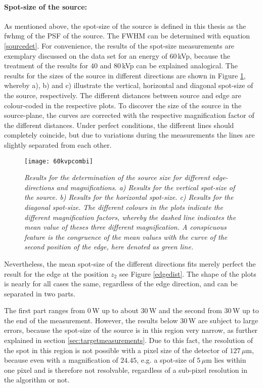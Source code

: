 \paragraph{Spot-size of the source:}
As mentioned above, the spot-size of the source is defined in this thesis as the \gls{fwhmg} of the PSF of the source. The FWHM can be determined with equation \ref{sourcedet}. For convenience, the results of the spot-size measurements are exemplary discussed on the data set for an energy of $60\,$kVp, because the treatment of the results for $40$ and $80\,$kVp can be explained analogical. The results for the sizes of the source in different directions are shown in Figure \ref{60kvpcombi}, whereby a), b) and c) illustrate the vertical, horizontal and diagonal spot-size of the source, respectively. The different distances between source and edge are colour-coded in the respective plots. To discover the size of the source in the source-plane, the curves are corrected with the respective magnification factor of the different distances. Under perfect conditions, the different lines should completely coincide, but due to variations during the measurements the lines are slightly separated from each other. 
\begin{figure}%
	\begin{center}
		\texttt{[image: 60kvpcombi]}
	\end{center}
	\caption[Results of the measurement of the source size for different directions ]{\textit{Results for the determination of the source size for different edge-directions and magnifications. a) Results for the vertical spot-size of the source. b) Results for the horizontal spot-size. c) Results for the diagonal spot-size. The different colours in the plots indicate the different magnification factors, whereby the dashed line indicates the mean value of theses three different magnification. A conspicuous feature is the congruence of the mean values with the curve of the second position of the edge, here denoted as green line.}}
	\label{60kvpcombi}
\end{figure}
\clearpage
Nevertheless, the mean spot-size of the different directions fits merely perfect the result for the edge at the position $z_{2}$ see Figure \ref{edgedist}. The shape of the plots is nearly for all cases the same, regardless of the edge direction, and can be separated in two parts. 

The first part ranges from $0\,$W up to about $30\,$W and the second from $30\,$W up to the end of the measurement. However, the results below $30\,$W are subject to large errors, because the spot-size of the source is in this region very narrow, as further explained in section \ref{sec:targetmeasurements}. Due to this fact, the resolution of the spot in this region is not possible with a pixel size of the detector of $127\,\mu$m, because even with a magnification of $24.45$, e.g. a spot-size of $5\,\mu$m lies within one pixel and is therefore not resolvable, regardless of a sub-pixel resolution in the algorithm or not.\\

